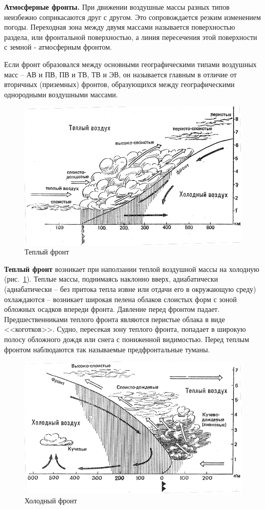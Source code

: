 \documentclass[a4paper, 12pt, twoside, final, book, russian, fittopage, cyremdash]{ncc}
\newcommand{\ris}[1]{\ref{fig:#1}}
\begin{document}
\textbf{Атмосферные фронты.} При движении воздушные массы разных типов неизбежно соприкасаются друг с другом. Это сопровождается резким изменением погоды. Переходная зона между двумя массами называется поверхностью раздела, или фронтальной поверхностью, а линия пересечения этой поверхности с земной - атмосферным фронтом.

Если фронт образовался между основными географическими типами воздушных масс \--- АВ и ПВ, ПВ и ТВ, ТВ и ЭВ, он называется главным в отличие от вторичных (приземных) фронтов, образующихся между географическими однородными воздушными массами.

\begin{figure}[htb]
  \centering{}
  \includegraphics[scale=1.3]{0121P}
  \caption{Теплый фронт}
  \label{fig:121}
\end{figure}

\textbf{Теплый фронт} возникает при наползании теплой воздушной массы на холодную (рис.~\ris{121}). Теплые массы, поднимаясь наклонно вверх, адиабатически (адиабатически \--- без притока тепла извне или отдачи его в окружающую среду) охлаждаются \--- возникает широкая пелена облаков слоистых форм с зоной обложных осадков впереди фронта. Давление перед фронтом падает. Предшественниками теплого фронта являются перистые облака в виде <<коготков>>. Судно, пересекая зону теплого фронта, попадает в широкую полосу обложного дождя или снега с пониженной видимостью. Перед теплым фронтом наблюдаются так называемые предфронтальные туманы.

\begin{figure}[htb]
  \centering{}
  \includegraphics[scale=1.3]{0122P}
  \caption{Холодный фронт}
  \label{fig:122}
\end{figure}
\end{document}
